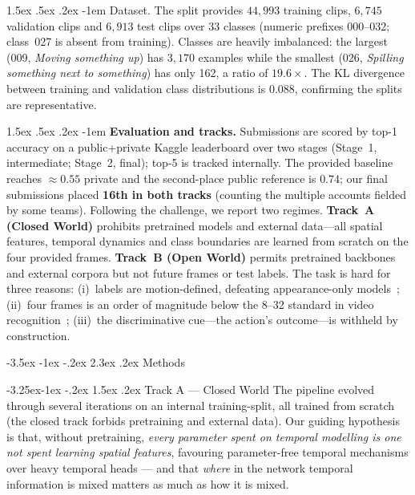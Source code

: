 \documentclass[10pt,twocolumn,letterpaper]{article}
\makeatletter
\renewcommand\section{\@startsection{section}{1}{\z@}%
  {-3.5ex \@plus -1ex \@minus -.2ex}%
  {2.3ex \@plus.2ex}%
  {\normalfont\Large\bfseries}}
\renewcommand\subsection{\@startsection{subsection}{2}{\z@}%
  {-3.25ex\@plus -1ex \@minus -.2ex}%
  {1.5ex \@plus .2ex}%
  {\normalfont\large\bfseries}}
\renewcommand\paragraph{\@startsection{paragraph}{4}{\z@}%
  {1.5ex \@plus .5ex \@minus .2ex}%
  {-1em}%
  {\normalfont\normalsize\bfseries}}
\makeatother
\begin{document}
\paragraph{Dataset.}
The split provides $44{,}993$ training clips, $6{,}745$ validation clips and
$6{,}913$ test clips over 33 classes (numeric prefixes 000--032; class~027 is
absent from training). Classes are heavily imbalanced: the largest (009,
\emph{Moving something up}) has $3{,}170$ examples while the smallest (026,
\emph{Spilling something next to something}) has only 162, a ratio of
$19.6\times$. The KL divergence between training and validation class
distributions is $0.088$, confirming the splits are representative.

\paragraph{\textbf{Evaluation and tracks.}}
Submissions are scored by top-1 accuracy on a public+private Kaggle leaderboard
over two stages (Stage~1, intermediate; Stage~2, final); top-5 is tracked
internally. The provided baseline reaches ${\approx}0.55$ private and the
second-place public reference is $0.74$; our final submissions placed
\textbf{16th in both tracks} (counting the multiple accounts fielded by some
teams). Following the challenge, we report two regimes. \textbf{Track~A (Closed
World)} prohibits pretrained models and external data---all spatial features,
temporal dynamics and class boundaries are learned from scratch on the four
provided frames. \textbf{Track~B (Open World)} permits pretrained backbones and
external corpora but not future frames or test labels. The task is hard for
three reasons: (i)~labels are motion-defined, defeating appearance-only
models~\cite{goyal2017ssv2}; (ii)~four frames is an order of magnitude below the
8--32 standard in video recognition~\cite{lin2019tsm,bertasius2021timesformer};
(iii)~the discriminative cue---the action's outcome---is withheld by
construction.

\section{Methods}
\label{sec:method}

\subsection{Track A --- Closed World}
\label{sec:trackA}
The pipeline evolved through several iterations on an internal training-split,
all trained from scratch (the closed track forbids pretraining and external
data). Our guiding hypothesis is that, without pretraining, \emph{every
parameter spent on temporal modelling is one not spent learning spatial
features}, favouring parameter-free temporal mechanisms over heavy temporal
heads --- and that \emph{where} in the network temporal information is mixed
matters as much as how it is mixed.
\end{document}
